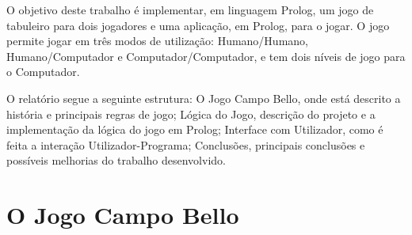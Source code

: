 \documentclass[a4paper]{article}
\begin{document}
O objetivo deste trabalho é implementar, em linguagem Prolog, um jogo de tabuleiro para dois jogadores e uma aplicação, em Prolog, para o jogar. O jogo permite jogar em três modos de utilização: Humano/Humano, Humano/Computador e Computador/Computador, e tem dois níveis de jogo para o Computador. 

O relatório segue a seguinte estrutura: O Jogo Campo Bello, onde está descrito a história e principais regras de jogo; Lógica do Jogo, descrição do projeto e a implementação da lógica do jogo em Prolog; Interface com Utilizador, como é feita a interação Utilizador-Programa; Conclusões, principais conclusões e possíveis melhorias do trabalho desenvolvido.


\section{O Jogo Campo Bello}
\end{document}
